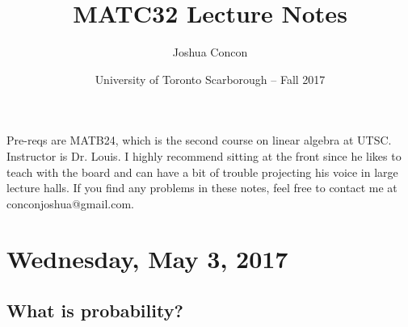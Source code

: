 \documentclass[12pt, twoside]{article}
\begin{document}
\title{MATC32 Lecture Notes}
\date{University of Toronto Scarborough -- Fall 2017}
\author{Joshua Concon}
\maketitle

Pre-reqs are MATB24, which is the second course on linear algebra at UTSC.
Instructor is Dr. Louis. I highly recommend sitting at the front since he likes to teach with the board and can have a bit of trouble projecting his voice in large lecture halls. If you find any problems in these notes, feel free to contact me at conconjoshua@gmail.com.

\tableofcontents

\pagebreak

\section{Wednesday, May 3, 2017}

\subsection{What is probability?}
\end{document}
